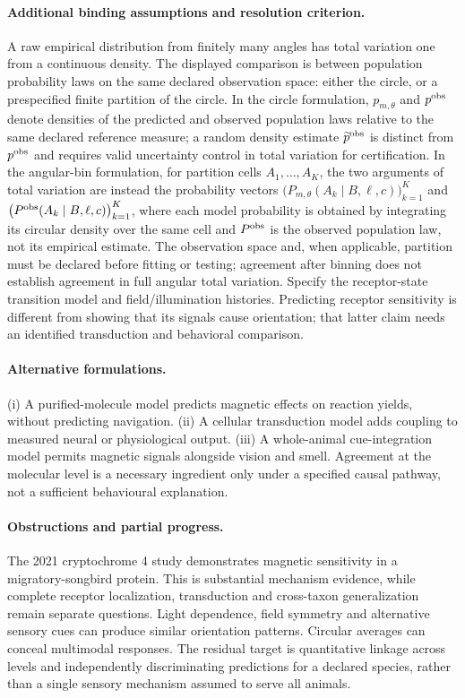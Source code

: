 \documentclass[11pt]{article}
\begin{document}
\paragraph{Additional binding assumptions and resolution criterion.} A raw empirical distribution from finitely many angles has total variation one from a continuous density. The displayed comparison is between population probability laws on the same declared observation space: either the circle, or a prespecified finite partition of the circle. In the circle formulation, $p_{m,\theta}$ and $p^{\rm obs}$ denote densities of the predicted and observed population laws relative to the same declared reference measure; a random density estimate $\widetilde p^{\rm obs}$ is distinct from $p^{\rm obs}$ and requires valid uncertainty control in total variation for certification. In the angular-bin formulation, for partition cells $A_1,\ldots,A_K$, the two arguments of total variation are instead the probability vectors $\bigl(P_{m,\theta}(A_k\mid B,\ell,c)\bigr)_{k=1}^K$ and $\bigl(P^{\rm obs}(A_k\mid B,\ell,c)\bigr)_{k=1}^K$, where each model probability is obtained by integrating its circular density over the same cell and $P^{\rm obs}$ is the observed population law, not its empirical estimate. The observation space and, when applicable, partition must be declared before fitting or testing; agreement after binning does not establish agreement in full angular total variation. Specify the receptor-state transition model and field/illumination histories. Predicting receptor sensitivity is different from showing that its signals cause orientation; that latter claim needs an identified transduction and behavioral comparison.

\paragraph{Alternative formulations.} (i) A purified-molecule model predicts magnetic effects on reaction yields, without predicting navigation. (ii) A cellular transduction model adds coupling to measured neural or physiological output. (iii) A whole-animal cue-integration model permits magnetic signals alongside vision and smell. Agreement at the molecular level is a necessary ingredient only under a specified causal pathway, not a sufficient behavioural explanation.

\paragraph{Obstructions and partial progress.} The 2021 cryptochrome 4 study demonstrates magnetic sensitivity in a migratory-songbird protein. This is substantial mechanism evidence, while complete receptor localization, transduction and cross-taxon generalization remain separate questions. Light dependence, field symmetry and alternative sensory cues can produce similar orientation patterns. Circular averages can conceal multimodal responses. The residual target is quantitative linkage across levels and independently discriminating predictions for a declared species, rather than a single sensory mechanism assumed to serve all animals.
\end{document}

